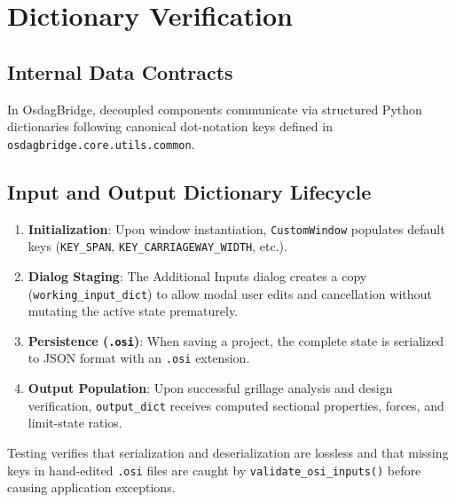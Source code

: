 \chapter{Dictionary Verification}
\label{chap:dictionary_verification}

\section{Internal Data Contracts}
In OsdagBridge, decoupled components communicate via structured Python dictionaries following canonical dot-notation keys defined in \texttt{osdagbridge.core.utils.common}. 

\section{Input and Output Dictionary Lifecycle}
\begin{enumerate}
    \item \textbf{Initialization}: Upon window instantiation, \texttt{CustomWindow} populates default keys (\texttt{KEY\_SPAN}, \texttt{KEY\_CARRIAGEWAY\_WIDTH}, etc.).
    \item \textbf{Dialog Staging}: The Additional Inputs dialog creates a copy (\texttt{working\_input\_dict}) to allow modal user edits and cancellation without mutating the active state prematurely.
    \item \textbf{Persistence (\texttt{.osi})}: When saving a project, the complete state is serialized to JSON format with an \texttt{.osi} extension.
    \item \textbf{Output Population}: Upon successful grillage analysis and design verification, \texttt{output\_dict} receives computed sectional properties, forces, and limit-state ratios.
\end{enumerate}

Testing verifies that serialization and deserialization are lossless and that missing keys in hand-edited \texttt{.osi} files are caught by \texttt{validate\_osi\_inputs()} before causing application exceptions.
